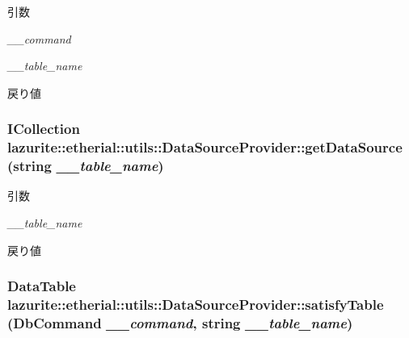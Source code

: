 \begin{DoxyParams}{引数}
\item[{\em \_\-\_\-command}]\item[{\em \_\-\_\-table\_\-name}]\end{DoxyParams}
\begin{DoxyReturn}{戻り値}

\end{DoxyReturn}
\hypertarget{classlazurite_1_1etherial_1_1utils_1_1_data_source_provider_ae03985b347b34ec696275e9b8ffc7b71}{
\subsubsection[{getDataSource}]{\setlength{\rightskip}{0pt plus 5cm}ICollection lazurite::etherial::utils::DataSourceProvider::getDataSource (string {\em \_\-\_\-table\_\-name})}}
\label{classlazurite_1_1etherial_1_1utils_1_1_data_source_provider_ae03985b347b34ec696275e9b8ffc7b71}

\begin{DoxyParams}{引数}
\item[{\em \_\-\_\-table\_\-name}]\end{DoxyParams}
\begin{DoxyReturn}{戻り値}

\end{DoxyReturn}
\hypertarget{classlazurite_1_1etherial_1_1utils_1_1_data_source_provider_abea4ea63fddd20c45edb4ee761c16171}{
\subsubsection[{satisfyTable}]{\setlength{\rightskip}{0pt plus 5cm}DataTable lazurite::etherial::utils::DataSourceProvider::satisfyTable (DbCommand {\em \_\-\_\-command}, \/  string {\em \_\-\_\-table\_\-name})}}
\label{classlazurite_1_1etherial_1_1utils_1_1_data_source_provider_abea4ea63fddd20c45edb4ee761c16171}

